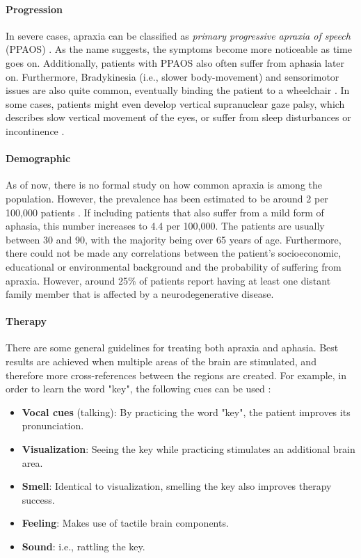 \documentclass[draft,final]{vutinfth} %
\begin{document}
\paragraph{Progression} In severe cases, apraxia can be classified as \emph{primary progressive apraxia of speech } (PPAOS) \cite{utianski2023update}. As the name suggests, the symptoms become more noticeable as time goes on. Additionally, patients with PPAOS also often suffer from aphasia later on. Furthermore, Bradykinesia (i.e., slower body-movement) and sensorimotor issues are also quite common, eventually binding the patient to a wheelchair \cite{utianski2023update}. In some cases, patients might even develop vertical supranuclear gaze palsy, which describes slow vertical movement of the eyes, or suffer from sleep disturbances or incontinence \cite{utianski2023update}.

\paragraph{Demographic} As of now, there is no formal study on how common apraxia is among the population. However, the prevalence has been estimated to be around 2 per 100,000 patients \cite{duffy2021primary}. If including patients that also suffer from a mild form of aphasia, this number increases to 4.4 per 100,000. The patients are usually between 30 and 90, with the majority being over 65 years of age. Furthermore, there could not be made any correlations between the patient's socioeconomic, educational or environmental background and the probability of suffering from apraxia. However, around 25\% of patients report having at least one distant family member that is affected by a neurodegenerative disease.

\paragraph{Therapy} There are some general guidelines for treating both apraxia and aphasia. Best results are achieved when multiple areas of the brain are stimulated, and therefore more cross-references between the regions are created. For example, in order to learn the word "key", the following cues can be used \cite{proestler2023}:
\begin{itemize}
\item \textbf{Vocal cues} (talking): By practicing the word "key", the patient improves its pronunciation.
\item \textbf{Visualization}: Seeing the key while practicing stimulates an additional brain area.
\item \textbf{Smell}: Identical to visualization, smelling the key also improves therapy success.
\item \textbf{Feeling}: Makes use of tactile brain components.
\item \textbf{Sound}: i.e., rattling the key.
\end{itemize}
\end{document}
